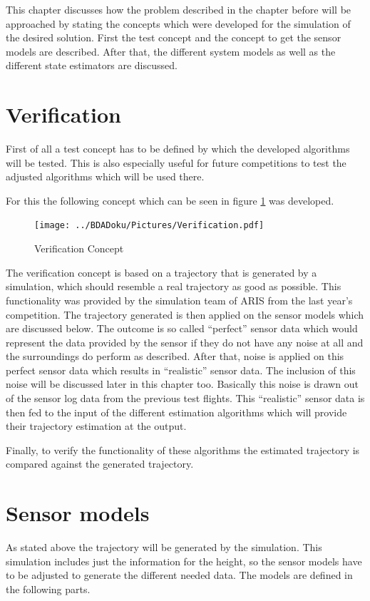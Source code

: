 
  This chapter discusses how the problem described in the chapter before will be approached by stating the concepts which were developed for the simulation of the desired solution.
  First the test concept and the concept to get the sensor models are described.
  After that, the different system models as well as the different state estimators are discussed.

  \section{Verification}
  First of all a test concept has to be defined by which the developed algorithms will be tested.
  This is also especially useful for future competitions to test the adjusted algorithms which will be used there.

  For this the following concept which can be seen in figure \ref{fig:Verification} was developed.

  \begin{figure}[h!]
   \centering
   \texttt{[image: ../BDADoku/Pictures/Verification.pdf]}
   \caption{Verification Concept}
   \label{fig:Verification}
  \end{figure}

  \newpage
  The verification concept is based on a trajectory that is generated by a simulation, which should resemble a real trajectory as good as possible.
  This functionality was provided by the simulation team of ARIS from the last year's competition.
  The trajectory generated is then applied on the sensor models which are discussed below.
  The outcome is so called ``perfect'' sensor data which would represent the data provided by the sensor if they do not have any noise at all and the surroundings do perform as described.
  After that, noise is applied on this perfect sensor data which results in ``realistic'' sensor data. The inclusion of this noise will be discussed later in this chapter too. Basically this noise is drawn out of the sensor log data from the previous test flights.
  This ``realistic'' sensor data is then fed to the input of the different estimation algorithms which will provide their trajectory estimation at the output.

  Finally, to verify the functionality of these algorithms the estimated trajectory is compared against the generated trajectory.


  \section{Sensor models}
  As stated above the trajectory will be generated by the simulation.
  This simulation includes just the information for the height, so the sensor models have to be adjusted to generate the different needed data.
  The models are defined in the following parts.

